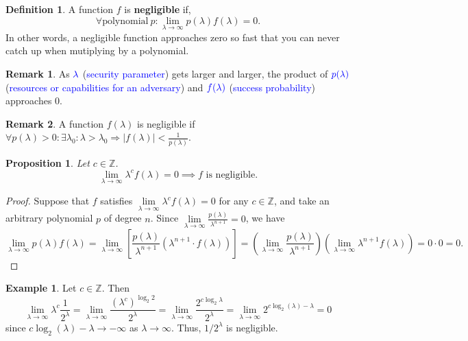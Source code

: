 \documentclass[12pt,openany]{book}
\newtheorem{proposition}[theorem]{Proposition}
\theoremstyle{definition}
\newtheorem{definition}{Definition}[chapter]
\newtheorem{remark}{Remark}[chapter]
\newtheorem{example}{Example}[chapter]
\newcommand{\Z}{\mathbb{Z}}
\renewcommand{\abs}[1]{\left\lvert #1 \right\rvert}
\begin{document}
	\begin{tcolorbox}[colframe=defcolor,title={\color{white}\bf Negligible}]
		\begin{definition}
			A function \(f\) is \textbf{negligible} if, \[
			\forall\text{polynomial}\ p:\lim\limits_{\lambda\to\infty}p(\lambda)f(\lambda)=0.
			\] In other words, a negligible function approaches zero so fast that you can never catch up when mutiplying by a polynomial.
		\end{definition}
	\end{tcolorbox}
	\begin{remark}
		As $\textcolor{blue}{\lambda}$ (\textcolor{blue}{security parameter}) gets larger and larger, the product of \(\textcolor{blue}{p(\lambda)}\) (\textcolor{blue}{resources or capabilities for an adversary}) and \(\textcolor{blue}{f(\lambda)}\) (\textcolor{blue}{success probability}) approaches \(0\).
	\end{remark}
	\begin{remark}
		A function $f(\lambda)$ is negligible if $\forall p(\lambda)> 0:\exists\lambda_0:\lambda>\lambda_0\Rightarrow \abs{f(\lambda)}<\frac{1}{p(\lambda)}$.
	\end{remark}
	\vspace{8pt}
	\begin{tcolorbox}[colframe=procolor,title={\color{white}\bf }]
		\begin{proposition}
			Let \(c\in\Z\). \[
			\lim\limits_{\lambda\to\infty}\lambda^cf(\lambda)=0\implies\text{$f$ is negligible}.
			\]
		\end{proposition}
	\end{tcolorbox}
	\begin{proof}
		Suppose that \(f\) satisfies \(\lim\limits_{\lambda\to\infty}\lambda^c f(\lambda)=0\) for any \(c\in\Z\), and take an arbitrary polynomial \(p\) of degree \(n\). Since \(\lim\limits_{\lambda\to\infty}\frac{p(\lambda)}{\lambda^{n+1}}=0\), we have \[
		\lim\limits_{\lambda\to\infty}p(\lambda)f(\lambda)=\lim\limits_{\lambda\to\infty}\left[\frac{p(\lambda)}{\lambda^{n+1}}\left(\lambda^{n+1}\cdot f(\lambda)\right)\right]=\left(\lim\limits_{\lambda\to\infty}\frac{p(\lambda)}{\lambda^{n+1}}\right)\left(\lim\limits_{\lambda\to\infty}\lambda^{n+1} f(\lambda)\right) = 0\cdot 0=0.
		\]
	\end{proof}
	\vspace{8pt}
	\begin{example}
		Let \(c\in\Z\). Then \[
		\lim\limits_{\lambda\to\infty}\lambda^c\frac{1}{2^\lambda}=
		\lim\limits_{\lambda\to\infty}\frac{(\lambda^c)^{\log_2 2}}{2^\lambda}=
		\lim\limits_{\lambda\to\infty}\frac{2^{c\log_2\lambda}}{2^\lambda}=
		\lim\limits_{\lambda\to\infty}2^{c\log_2(\lambda)-\lambda}=0
		\] since \(c\log_2(\lambda)-\lambda\to-\infty\) as \(\lambda\to\infty\).
		 Thus, \(1/2^\lambda\) is negligible.
	\end{example}
\end{document}
